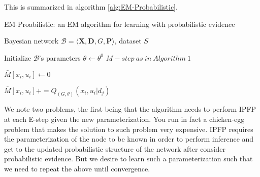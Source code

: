 \documentclass[11pt]{article}
\begin{document}
\begin{article}
This is summarized in algorithm \ref{alg:EM-Probabilistic}.

\algrenewcommand\algorithmicindent{1.5em}%

\begin{algorithm*}[h!]
\caption{EM-Proabilistic: an EM algorithm for learning with probabilistic evidence}
\label{alg:EM-Probabilistic}
\vspace{-10pt}
\begin{multicols}{2}
\begin{algorithmic}[1] 
\Require Bayesian network $\mathcal{B}=\langle \mathbf{X},\mathbf{D}, G, \mathbf{P} \rangle$, dataset $S$ 

\State Initialize $\mathcal{B}$'s parameters $\theta \leftarrow \theta^0$
  \State $M-step \ as \ in \ Algorithm \ 1$
\EndFor
\\


   \State $\bar{M}[x_{i},u_{i}]\leftarrow 0$
  \EndFor
\EndFor




        \State $\bar{M}[x_{i},u_{i}] \mathrel{{+}{=}} Q_{(G,\theta)}(x_{i},u_{i}|d_{j})$ 
      \EndFor
    \EndFor
\EndFor
\EndProcedure

\end{algorithmic}
\end{multicols}
\end{algorithm*}

We note two problems, the first being that
the algorithm needs to perform IPFP at each E-step given the new
parameterization. You run in fact a chicken-egg problem that makes
the solution to such problem very expensive. IPFP requires the
parameterization of the node to be known in order to perform
inference and get to the updated probabilistic structure of the
network after consider probabilistic evidence. But we desire to
learn such a parameterization such that we need to repeat the above
until convergence.


\end{article}
\end{document}
